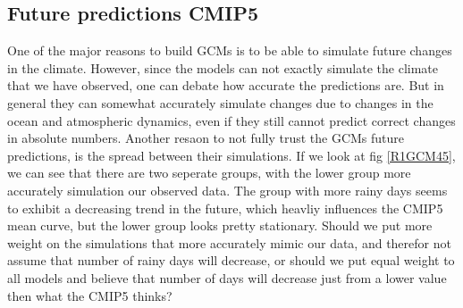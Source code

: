 \documentclass{article}
\begin{document}
\subsection{Future predictions CMIP5}
One of the major reasons to build GCMs is to be able to simulate future changes in the climate. However, since the models can not exactly simulate the climate that we have observed, one can debate how accurate the predictions are. But in general they can somewhat accurately simulate changes due to changes in the ocean and atmospheric dynamics, even if they still cannot predict correct changes in absolute numbers. Another resaon to not fully trust the GCMs future predictions, is the spread between their simulations. If we look at fig \ref{R1GCM45}, we can see that there are two seperate groups, with the lower group more accurately simulation our observed data. The group with more rainy days seems to exhibit a decreasing trend in the future, which heavliy influences the CMIP5 mean curve, but the lower group looks pretty stationary. Should we put more weight on the simulations that more accurately mimic our data, and therefor not assume that number of rainy days will decrease, or should we put equal weight to all models and believe that number of days will decrease just from a lower value then what the CMIP5 thinks?
\end{document}
